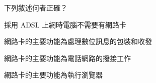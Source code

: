 \ifx\ntpcNinetyTwo\undefined[92學年基北區] \fi
下列敘述何者正確？
  \begin{optionlist}
  \item 採用 ADSL 上網時電腦不需要有網路卡
  \item 網路卡的主要功能為處理數位訊息的包裝和收發\label{ntpc-92-a37}
  \item 網路卡的主要功能為電話網路的撥接工作
  \item 網路卡的主要功能為執行瀏覽器
  \end{optionlist}